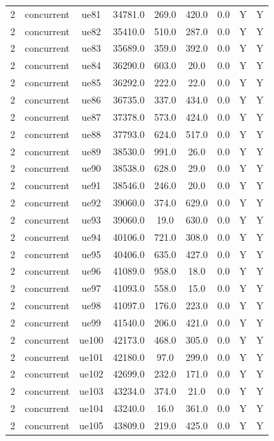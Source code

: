 \begin{table}[ht]
\begin{tabular}{|c|c|c|c|c|c|c|c|c|}
2 & concurrent & ue81 & 34781.0 & 269.0 & 420.0 & 0.0 & Y & Y \\
2 & concurrent & ue82 & 35410.0 & 510.0 & 287.0 & 0.0 & Y & Y \\
2 & concurrent & ue83 & 35689.0 & 359.0 & 392.0 & 0.0 & Y & Y \\
2 & concurrent & ue84 & 36290.0 & 603.0 & 20.0 & 0.0 & Y & Y \\
2 & concurrent & ue85 & 36292.0 & 222.0 & 22.0 & 0.0 & Y & Y \\
2 & concurrent & ue86 & 36735.0 & 337.0 & 434.0 & 0.0 & Y & Y \\
2 & concurrent & ue87 & 37378.0 & 573.0 & 424.0 & 0.0 & Y & Y \\
2 & concurrent & ue88 & 37793.0 & 624.0 & 517.0 & 0.0 & Y & Y \\
2 & concurrent & ue89 & 38530.0 & 991.0 & 26.0 & 0.0 & Y & Y \\
2 & concurrent & ue90 & 38538.0 & 628.0 & 29.0 & 0.0 & Y & Y \\
2 & concurrent & ue91 & 38546.0 & 246.0 & 20.0 & 0.0 & Y & Y \\
2 & concurrent & ue92 & 39060.0 & 374.0 & 629.0 & 0.0 & Y & Y \\
2 & concurrent & ue93 & 39060.0 & 19.0 & 630.0 & 0.0 & Y & Y \\
2 & concurrent & ue94 & 40106.0 & 721.0 & 308.0 & 0.0 & Y & Y \\
2 & concurrent & ue95 & 40406.0 & 635.0 & 427.0 & 0.0 & Y & Y \\
2 & concurrent & ue96 & 41089.0 & 958.0 & 18.0 & 0.0 & Y & Y \\
2 & concurrent & ue97 & 41093.0 & 558.0 & 15.0 & 0.0 & Y & Y \\
2 & concurrent & ue98 & 41097.0 & 176.0 & 223.0 & 0.0 & Y & Y \\
2 & concurrent & ue99 & 41540.0 & 206.0 & 421.0 & 0.0 & Y & Y \\
2 & concurrent & ue100 & 42173.0 & 468.0 & 305.0 & 0.0 & Y & Y \\
2 & concurrent & ue101 & 42180.0 & 97.0 & 299.0 & 0.0 & Y & Y \\
2 & concurrent & ue102 & 42699.0 & 232.0 & 171.0 & 0.0 & Y & Y \\
2 & concurrent & ue103 & 43234.0 & 374.0 & 21.0 & 0.0 & Y & Y \\
2 & concurrent & ue104 & 43240.0 & 16.0 & 361.0 & 0.0 & Y & Y \\
2 & concurrent & ue105 & 43809.0 & 219.0 & 425.0 & 0.0 & Y & Y \\

\end{tabular}
\end{table}
